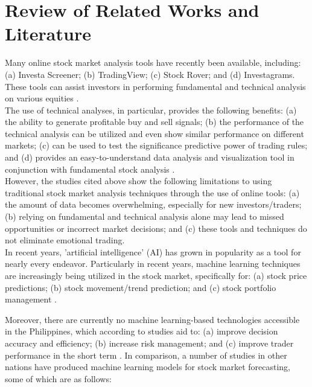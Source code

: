 \chapter{Review of Related Works and Literature}
\label{chap:lit_review}
Many online stock market analysis tools have recently been available, including: 
(a) Investa Screener; (b) TradingView; (c) Stock Rover; and (d) Investagrams. 
These tools can assist investors in performing fundamental and technical analysis on 
various equities
\cite{Benignos2020, Carey2023, DayTradingz, Investagrams}.
\\

The use of technical analyses, in particular, provides the following 
benefits: (a) the ability to generate profitable buy and sell signals; (b) the performance 
of the technical analysis can be utilized and even show similar performance on different 
markets; (c) can be used to test the significance predictive power of trading rules; and 
(d) provides an easy-to-understand data analysis and visualization tool in conjunction 
with fundamental stock analysis
\cite{Abbad2014AdvantagesOU, Priatmojo2022TechnicalAT, Ausloos_2002, Tangsripairoj2020StockifyAW}.
\\

However, the studies cited above show the following limitations to using 
traditional stock market analysis techniques through the use of online tools: 
(a) the amount of data becomes overwhelming, especially for new investors/traders; 
(b) relying on fundamental and technical analysis alone may lead to missed 
opportunities or incorrect market decisions; and (c) these tools and techniques 
do not eliminate emotional trading.
\\

In recent years, 'artificial intelligence' (AI) has grown in popularity as a tool 
for nearly every endeavor. Particularly in recent years, machine learning techniques 
are increasingly being utilized in the stock market, specifically for: 
(a) stock price predictions; (b) stock movement/trend prediction; and 
(c) stock portfolio management
\cite{Kumbure2022, Strader2020, Soni2022, Rea2020, Guo2022, Budiharto2021}. 

Moreover, there are currently no machine learning-based technologies accessible in the 
Philippines, which according to studies aid to: (a) improve decision accuracy and efficiency; 
(b) increase risk management; and (c) improve trader performance in the short term
\cite{Lu2022MachineLI, Shaheen2020UseOM, Singh_2022, Prasad2021ImportanceOM, 
Zhang2022ApplicationOB, Obthong2020}. In comparison, a number of studies in other nations have 
produced machine learning models for stock market forecasting, some of which are as follows:
\\

